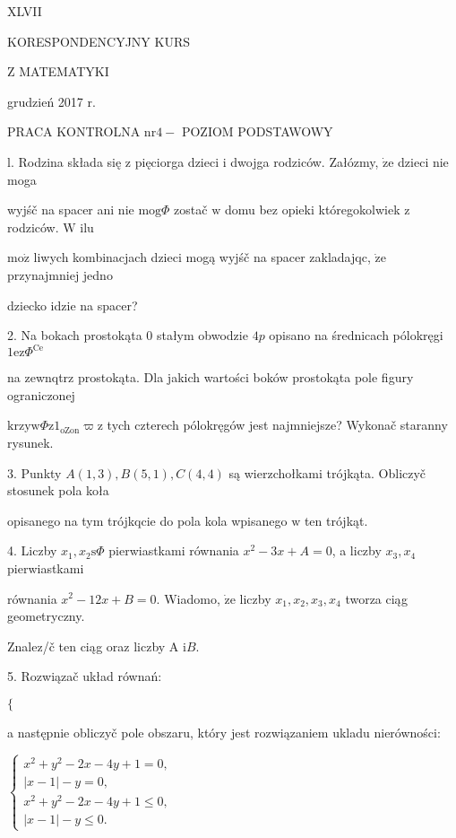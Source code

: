 \documentclass[a4paper,12pt]{article}
\begin{document}
XLVII

KORESPONDENCYJNY KURS

Z MATEMATYKI

grudzień 2017 r.

PRACA KONTROLNA $\mathrm{n}\mathrm{r} 4-$ POZIOM PODSTAWOWY

l. Rodzina składa się $\mathrm{z}$ pięciorga dzieci $\mathrm{i}$ dwojga rodziców. Załózmy, $\dot{\mathrm{z}}\mathrm{e}$ dzieci nie moga

wyjśč na spacer ani nie $\mathrm{m}\mathrm{o}\mathrm{g}\Phi$ zostač $\mathrm{w}$ domu bez opieki któregokolwiek $\mathrm{z}$ rodziców. $\mathrm{W}$ ilu

$\mathrm{m}\mathrm{o}\dot{\mathrm{z}}$ liwych kombinacjach dzieci mogą wyjśč na spacer zakladajqc, $\dot{\mathrm{z}}\mathrm{e}$ przynajmniej jedno

dziecko idzie na spacer?

2. Na bokach prostokąta $0$ stałym obwodzie $4p$ opisano na średnicach pólokręgi $1\mathrm{e}\mathrm{z}\Phi^{\mathrm{C}\mathrm{e}}$

na zewnqtrz prostokąta. Dla jakich wartości boków prostokąta pole figury ograniczonej

$\mathrm{k}\mathrm{r}\mathrm{z}\mathrm{y}\mathrm{w}\Phi \mathrm{z}1_{\mathrm{o}\mathrm{Z}\mathrm{o}\mathrm{n}}\varpi \mathrm{z}$ tych czterech pólokręgów jest najmniejsze? Wykonač staranny rysunek.

3. Punkty $A(1,3), B(5,1), C(4,4)$ są wierzchołkami trójkąta. Obliczyč stosunek pola koła

opisanego na tym trójkqcie do pola kola wpisanego $\mathrm{w}$ ten trójkąt.

4. Liczby $x_{1},  x_{2}\mathrm{s}\Phi$ pierwiastkami równania $x^{2}-3x+A=0$, a liczby $x_{3}, x_{4}$ pierwiastkami

równania $x^{2}-12x+B=0$. Wiadomo, $\dot{\mathrm{z}}\mathrm{e}$ liczby $x_{1}, x_{2}, x_{3}, x_{4}$ tworza ciąg geometryczny.

Znalez/č ten ciąg oraz liczby A $\mathrm{i}B.$

5. Rozwiązač układ równań:

$\{$

a następnie obliczyč pole obszaru, który jest rozwiązaniem ukladu nierówności:

$\left\{\begin{array}{l}
x^{2}+y^{2}-2x-4y+1=0,\\
|x-1|-y=0,\\
x^{2}+y^{2}-2x-4y+1\leq 0,\\
|x-1|-y\leq 0.
\end{array}\right.$
\end{document}
